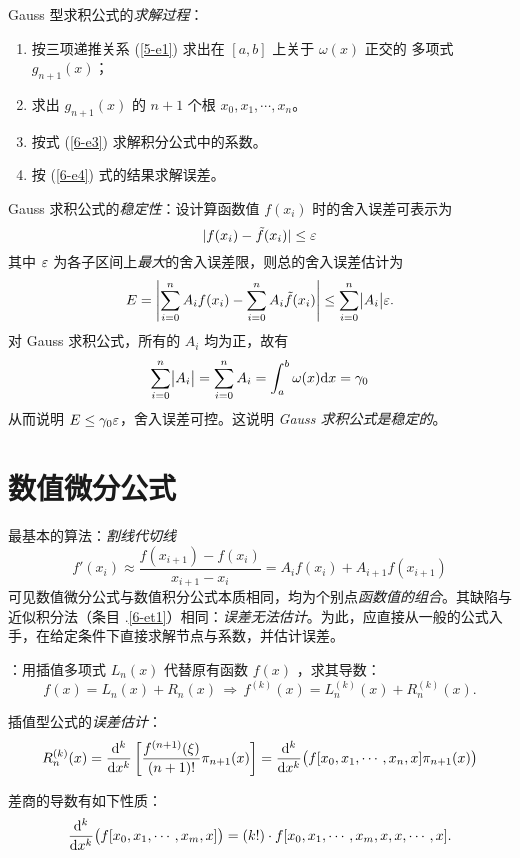 \entry Gauss 型求积公式的\emph{求解过程}：
\begin{enumerate}\tl
    \item 按三项递推关系 (\ref{5-e1}) 求出在 $[a,b]$ 上关于 $\omega(x)$ 正交的
    多项式 $g_{n+1}(x)$；
    \item 求出 $g_{n+1}(x)$ 的 $n+1$ 个根 $x_0,x_1,\cdots,x_n$。
    \item 按式 (\ref{6-e3}) 求解积分公式中的系数。
    \item 按 (\ref{6-e4}) 式的结果求解误差。
\end{enumerate}

\entry Gauss 求积公式的\emph{稳定性}：设计算函数值 $f(x_i)$ 时的舍入误差可表示为
\[ |f(x_i)-\tilde{f}(x_i)|\leq\varepsilon \]
其中 $\varepsilon$ 为各子区间上\emph{最大}的舍入误差限，则总的舍入误差估计为
\begin{equation}
E=\left|\sum_{i=0}^nA_if(x_i)-\sum_{i=0}^nA_i\tilde{f}(x_i)\right|\leq\sum_{i=0}%
^n\bigl|A_i\bigr|\vepsilon.
\end{equation}
对 Gauss 求积公式，所有的 $A_i$ 均为正，故有
\[ \sum_{i=0}^n\bigl|A_i\bigr|=\sum_{i=0}^nA_i=\int_a^b\omega(x)\mathrm{d} x=\gamma_0 \]
从而说明 $E\leq\gamma_0\varepsilon$，舍入误差可控。这说明 \emph{Gauss 求积公式是稳定的}。

\section{数值微分公式}
\entry 最基本的算法：\emph{割线代切线}
\[ f'(x_i)\approx\frac{f(x_{i+1})-f(x_i)}{x_{i+1}-x_i}=A_if(x_i)+A_{i+1}f(x_{i+1}) \]
可见数值微分公式与数值积分公式本质相同，均为个别点\emph{函数值的组合}。其缺陷与近似积分法（条目 .\ref{6-et1}）相同：\emph{误差无法估计}。为此，应直接从一般的公式入手，在给定条件下直接求解节点与系数，并估计误差。

\entry {}：用插值多项式 $L_n(x)$ 代替原有函数 $f(x)$ ，求其导数：
\[ f(x)=L_n(x)+R_n(x)\,\Rightarrow\,f^{(k)}(x)=L_n^{(k)}(x)+R_n^{(k)}(x).\]

\entry 插值型公式的\emph{误差估计}：
\[ R_n^{(k)}(x)=\frac{\mathrm{d}^k}{\mathrm{d} x^k}\left[\frac{f^{(n+1)}(\xi)}{(n+1)!}
\pi_{n+1}(x)\right]=\frac{\mathrm{d}^k}{\mathrm{d} x^k}\bigl(f[x_0,x_1,\cdots,x_n,x]\pi_{n+1}(x)
\bigr) \]

\trm 差商的导数有如下性质：
\begin{equation}
\frac{\mathrm{d}^k}{\mathrm{d} x^k}\bigl(f[x_0,x_1,\cdots,x_m,x]\bigr)=(k!)\cdot f[x_0,x_1,\cdots,x_m,x,x,\cdots,x].
\end{equation}

